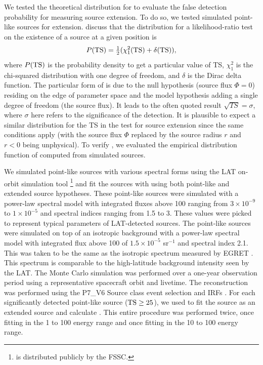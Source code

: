 We tested the theoretical distribution for \tsext to evaluate
the false detection probability for measuring source extension.
To do so, we tested simulated point-like sources for extension.
\cite{mattox_1996a_likelihood-analysis} discuss that the \ts distribution
for a likelihood-ratio test on the existence of a source at a given
position is
\begin{equation}\eqnlabel{ts_ext_distribution}
  P(\ts)=\tfrac{1}{2}(\chi^2_1(\ts)+\delta(\ts)),
\end{equation}
where $P(\mathrm{TS})$ is the probability density to get a particular value
of TS, $\chi^2_1$ is the chi-squared distribution with one degree of
freedom, and $\delta$ is the Dirac delta function.  The particular
form of  is due to the null hypothesis
(source flux $\Phi=0$) residing on the edge of parameter space and the
model hypothesis adding a single degree of freedom (the source flux).
It leads to the often quoted result $\sqrt{TS}=\sigma$, where $\sigma$
here refers to the significance of the detection. It is plausible
to expect a similar distribution for the TS in the test for source
extension since the same conditions apply (with the source flux $\Phi$
replaced by the source radius $r$ and $r<0$ being unphysical).  To verify
, we evaluated the empirical distribution
function of \tsext computed from simulated sources.

We simulated point-like sources with various spectral forms using the
LAT on-orbit simulation tool \gtobssim\footnote{\gtobssim is distributed
publicly by the FSSC.} and fit the sources with \pointlike using both
point-like and extended source hypotheses.  These point-like sources
were simulated with a power-law spectral model with integrated fluxes
above 100 \mev ranging from $3\times10^{-9}$ to $1\times10^{-5}$
\fluxunits and spectral indices ranging from 1.5 to 3.  These values
were picked to represent typical parameters of LAT-detected sources. The
point-like sources were simulated on top of an isotropic background
with a power-law spectral model with integrated flux above 100 \mev
of $1.5\times10^{-5}$ \fluxunits sr$^{-1}$ and spectral index 2.1.
This was taken to be the same as the isotropic spectrum measured by EGRET
\citep{sreekumar_1998a_egret-observations}.  This spectrum is comparable
to the high-latitude background intensity seen by the LAT.  The Monte
Carlo simulation was performed over a one-year observation period using
a representative spacecraft orbit and livetime.  The reconstruction
was performed using the P7\_V6 Source class event selection and IRFs
\citep{ackermann_2012a_fermi-large}. For each significantly detected
point-like source ($\mathrm{TS}\ge25$), we used \pointlike to fit the source
as an extended source and calculate \tsext.  This entire procedure was
performed twice, once fitting in the 1 \gev to 100 \gev energy range
and once fitting in the 10 \gev to 100 \gev energy range.

